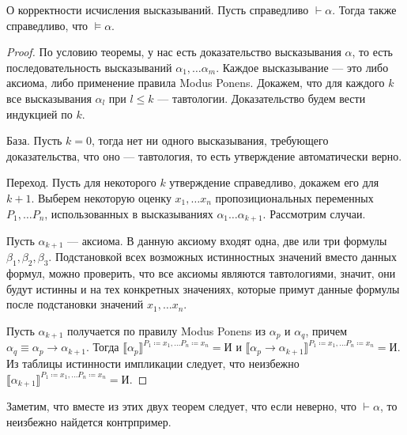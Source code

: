 \begin{theorem}{О корректности исчисления высказываний.}
Пусть справедливо $\vdash \alpha$. Тогда также справедливо, что $\models \alpha$.
\end{theorem}

\begin{proof}
По условию теоремы, у нас есть доказательство высказывания $\alpha$, то есть 
последовательность высказываний $\alpha_1, \dots \alpha_m$.
Каждое высказывание --- это либо аксиома, либо применение правила Modus Ponens.
Докажем, что для каждого $k$ все высказывания $\alpha_l$ при $l \le k$ --- тавтологии.
Доказательство будем вести индукцией по $k$.

База. Пусть $k=0$, тогда нет ни одного высказывания, требующего доказательства, что
оно --- тавтология, то есть утверждение автоматически верно.

Переход. Пусть для некоторого $k$ утверждение справедливо, докажем его для $k+1$.
Выберем некоторую оценку $x_1, \dots x_n$ пропозициональных 
переменных $P_1, \dots P_n$, использованных в высказываниях $\alpha_1 \dots \alpha_{k+1}$.
Рассмотрим случаи. 

Пусть $\alpha_{k+1}$ --- аксиома. В данную аксиому входят одна, две или три формулы
$\beta_1, \beta_2, \beta_3$. Подстановкой всех возможных истинностных значений
вместо данных формул, можно проверить, что все аксиомы являются тавтологиями,
значит, они будут истинны и на тех конкретных значениях, которые примут данные формулы
после подстановки значений $x_1, \dots x_n$.

Пусть $\alpha_{k+1}$ получается по правилу Modus Ponens из $\alpha_p$ и 
$\alpha_q$, причем $\alpha_q \equiv \alpha_p \rightarrow \alpha_{k+1}$.
Тогда $\llbracket\alpha_p\rrbracket^{P_1 \coloneqq  x_1, \dots P_n\coloneqq x_n} = \texttt{И}$ и 
$\llbracket\alpha_p \rightarrow \alpha_{k+1}\rrbracket^{P_1\coloneqq x_1, \dots P_n\coloneqq x_n} = \texttt{И}$.
Из таблицы истинности импликации следует, что неизбежно 
$\llbracket\alpha_{k+1}\rrbracket^{P_1\coloneqq x_1, \dots P_n\coloneqq x_n} = \texttt{И}$.

\end{proof}

Заметим, что вместе из этих двух теорем следует, что если неверно, что $\vdash \alpha$,
то неизбежно найдется контрпример.

